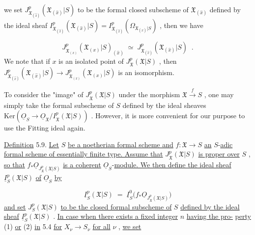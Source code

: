 we set $J^{p}_{\mathfrak{X}_{(\hat{x})}}(\mathfrak{X}_{(\hat{x})}|S)$ to be the formal closed subscheme of $\mathfrak{X}_{(\hat{x})}$ defined by the ideal sheaf $I^{p}_{\mathfrak{X}_{(\hat{x})}}(\mathfrak{X}_{(\hat{x})}|S) = I^{p}_{\mathfrak{X}_{(\hat{x})}}(\Omega_{\mathfrak{X}_{(\hat{x})}|S})$ , then we have

\begin{equation*}
J^{p}_{\mathfrak{X}_{(x)}}(\mathfrak{X}_{(x)}|S)_{(\hat{x})} \;\simeq\; J^{p}_{\mathfrak{X}_{(\hat{x})}}(\mathfrak{X}_{(\hat{x})}|S) \;\;.
\end{equation*}
We note that if $x$ is an isolated point of $J^{p}_{\mathfrak{X}}(\mathfrak{X}|S)$ , then $J^{p}_{\mathfrak{X}_{(\hat{x})}}(\mathfrak{X}_{(\hat{x})}|S) \to J^{p}_{\mathfrak{X}_{(x)}}(\mathfrak{X}_{(x)}|S)$ is an isomorphism.

To consider the "image" of $J^{p}_{\mathfrak{X}}(\mathfrak{X}|S)$ under the morphism $\mathfrak{X} \xrightarrow{\,f\,} S$ , one may simply take the formal subscheme of $S$ defined by the ideal sheaves $\mathrm{Ker}(\underline{O}_S \to \underline{O}_{\mathfrak{X}}/I^{p}_{\mathfrak{X}}(\mathfrak{X}|S))$ . However, it is more convenient for our purpose to use the Fitting ideal again.

\underline{Definition} 5.9. \underline{Let} $S$ \underline{be a noetherian formal scheme and} $f : \mathfrak{X} \to S$ \underline{an} $S$-\underline{adic formal scheme of essentially finite type. Assume that} $J^{p}_{\mathfrak{X}}(\mathfrak{X}|S)$ \underline{is proper over} $S$ , \underline{so that} $f_{*}\underline{O}_{J^{p}_{\mathfrak{X}}(\mathfrak{X}|S)}$ \underline{is a coherent} $\underline{O}_S$-\underline{module. We then define the ideal sheaf} $\underline{I}^{p}_{S}(\mathfrak{X}|S)$ \underline{of} $\underline{O}_S$ \underline{by}

\begin{equation*}
\underline{I}^{p}_{S}(\mathfrak{X}|S) \;=\; \underline{I}^{0}_{S}\big(f_{*}\underline{O}_{J^{p}_{\mathfrak{X}}(\mathfrak{X}|S)}\big)
\end{equation*}
\underline{and set} $J^{p}_{S}(\mathfrak{X}|S)$ \underline{to be the closed formal subscheme of} $S$ \underline{defined by the ideal sheaf} $\underline{I}^{p}_{S}(\mathfrak{X}|S)$ . \underline{In case when there exists a fixed integer} $n$ \underline{having the pro-}
\underline{perty} (1) \underline{or} (2) \underline{in} 5.4 \underline{for} $X_\nu \to S_\nu$ \underline{for all} $\nu$ , \underline{we set}

